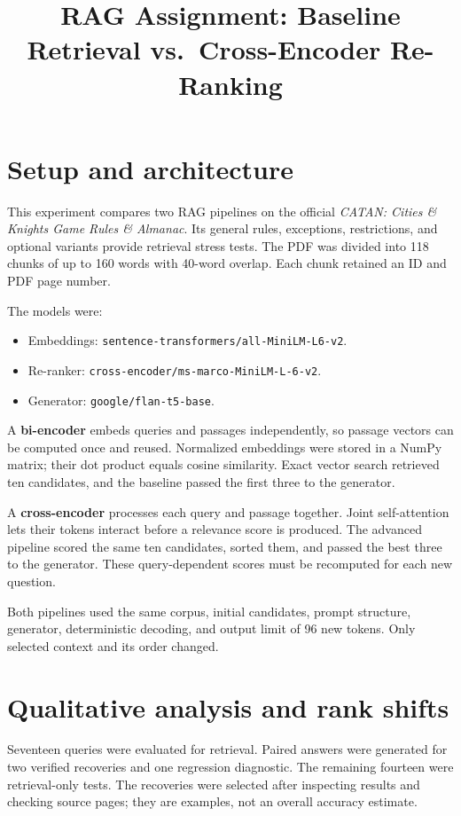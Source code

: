 \documentclass[10pt,a4paper]{article}
\title{\vspace{-2em}RAG Assignment: Baseline Retrieval vs.\ Cross-Encoder Re-Ranking}
\author{}
\date{}
\begin{document}
\maketitle
\vspace{-2.5em}

\section{Setup and architecture}
This experiment compares two RAG pipelines on the official \emph{CATAN: Cities \& Knights Game Rules \& Almanac}. Its general rules, exceptions, restrictions, and optional variants provide retrieval stress tests. The PDF was divided into 118 chunks of up to 160 words with 40-word overlap. Each chunk retained an ID and PDF page number.

The models were:
\begin{itemize}
\item Embeddings: \texttt{sentence-transformers/all-MiniLM-L6-v2}.
\item Re-ranker: \texttt{cross-encoder/ms-marco-MiniLM-L-6-v2}.
\item Generator: \texttt{google/flan-t5-base}.
\end{itemize}

A \textbf{bi-encoder} embeds queries and passages independently, so passage vectors can be computed once and reused. Normalized embeddings were stored in a NumPy matrix; their dot product equals cosine similarity. Exact vector search retrieved ten candidates, and the baseline passed the first three to the generator.

A \textbf{cross-encoder} processes each query and passage together. Joint self-attention lets their tokens interact before a relevance score is produced. The advanced pipeline scored the same ten candidates, sorted them, and passed the best three to the generator. These query-dependent scores must be recomputed for each new question.

Both pipelines used the same corpus, initial candidates, prompt structure, generator, deterministic decoding, and output limit of 96 new tokens. Only selected context and its order changed.

\section{Qualitative analysis and rank shifts}
Seventeen queries were evaluated for retrieval. Paired answers were generated for two verified recoveries and one regression diagnostic. The remaining fourteen were retrieval-only tests. The recoveries were selected after inspecting results and checking source pages; they are examples, not an overall accuracy estimate.
\end{document}
